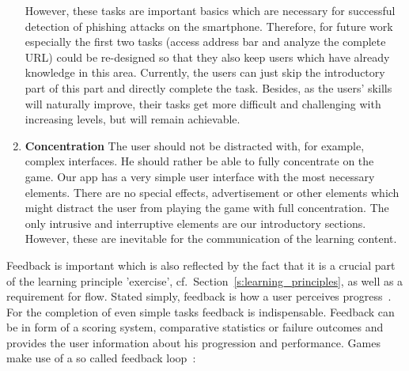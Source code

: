 \begin{description}[leftmargin=0cm]
\begin{enumerate}
However, these tasks are important basics which are necessary for successful detection of phishing attacks on the smartphone. 
Therefore, for future work especially the first two tasks (access address bar and analyze the complete URL) could be re-designed so that they also keep users which have already knowledge in this area.
Currently, the users can just skip the introductory part of this part and directly complete the task.
Besides, as the users' skills will naturally improve, their tasks get more difficult and challenging with increasing levels, but will remain achievable.
		\item \textbf{Concentration} The user should not be distracted with, for example, complex interfaces. 
He should rather be able to fully concentrate on the game. 
Our app has a very simple user interface with the most necessary elements. 
There are no special effects, advertisement or other elements which might distract the user from playing the game with full concentration.
The only intrusive and interruptive elements are our introductory sections. 
However, these are inevitable for the communication of the learning content.
	\end{enumerate}
	\item[Feedback] Feedback is important which is also reflected by the fact that it is a crucial part of the learning principle 'exercise', cf.~Section~\ref{s:learning_principles}, as well as a requirement for flow.
Stated simply, feedback is how a user perceives progress~\cite{csikszentmihalyi1990flow, csikszentmihalyi1997finding}.
For the completion of even simple tasks feedback is indispensable.
Feedback can be in form of a scoring system, comparative statistics or failure outcomes and provides the user information about his progression and performance.
Games make use of a so called feedback loop~\cite{goetz2011harnessing}:


\end{description}
